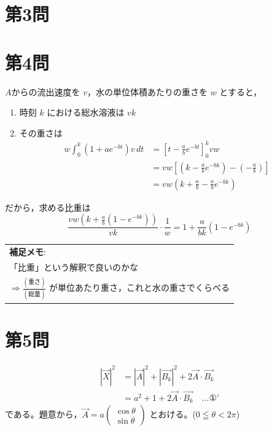 \documentclass[../main.tex]{subfiles}
\begin{document}
\newpage

\section*{第3問}

\newpage

\section*{第4問}

\noindent
[\textbf{解}] $A$からの流出速度を $v$，水の単位体積あたりの重さを $w$ とすると，

\begin{enumerate}
  \item[ア] 時刻 $k$ における総水溶液は $vk$
  \item[イ] その重さは
    \[
      \begin{aligned}
        w \int_0^k (1+ae^{-bt}) v \, dt &= \left[ t - \frac{a}{b} e^{-bt} \right]_0^k v w \\
        &= vw \left[ \left( k - \frac{a}{b} e^{-bk} \right) - \left( -\frac{a}{b} \right) \right] \\
        &= vw \left( k + \frac{a}{b} - \frac{a}{b} e^{-bk} \right)
      \end{aligned}
    \]
\end{enumerate}

だから，求める比重は
\[
  \frac{vw \left( k + \frac{a}{b}(1 - e^{-bk}) \right)}{vk} \cdot \frac{1}{w} = 1 + \frac{a}{bk} (1 - e^{-bk})
\]

\begin{center}
  \small
  \begin{tabular}{|p{}|}
    \hline
    \textbf{補足メモ}: \\
    「比重」という解釈で良いのかな \\
    $\Rightarrow \frac{(\text{重さ})}{(\text{総量})}$ が単位あたり重さ，これと水の重さでくらべる \\
    \hline
  \end{tabular}
\end{center}

\newpage

\section*{第5問}

\noindent
[\textbf{解}]
\[
  \begin{aligned}
    |\vec{X}|^2 &= |\vec{A}|^2 + |\vec{B_k}|^2 + 2\vec{A} \cdot \vec{B_k} \\
    &= a^2 + 1 + 2\vec{A} \cdot \vec{B_k} \quad \dots \text{①'}
  \end{aligned}
\]
である。題意から，$\vec{A} = a
\begin{pmatrix} \cos\theta \\ \sin\theta
\end{pmatrix}$ とおける。($0 \leqq \theta < 2\pi$)
\end{document}
